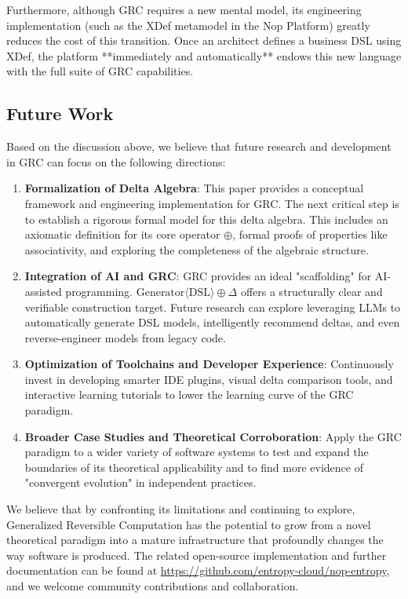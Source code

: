 \documentclass[11pt]{article}
\begin{document}
Furthermore, although GRC requires a new mental model, its engineering implementation (such as the XDef metamodel in the Nop Platform) greatly reduces the cost of this transition. Once an architect defines a business DSL using XDef, the platform **immediately and automatically** endows this new language with the full suite of GRC capabilities.

\subsection{Future Work}

Based on the discussion above, we believe that future research and development in GRC can focus on the following directions:

\begin{enumerate}
    \item \textbf{Formalization of Delta Algebra}: This paper provides a conceptual framework and engineering implementation for GRC. The next critical step is to establish a rigorous formal model for this delta algebra. This includes an axiomatic definition for its core operator $\oplus$, formal proofs of properties like associativity, and exploring the completeness of the algebraic structure.
    \item \textbf{Integration of AI and GRC}: GRC provides an ideal "scaffolding" for AI-assisted programming. $\text{Generator}\langle\text{DSL}\rangle \oplus \Delta$ offers a structurally clear and verifiable construction target. Future research can explore leveraging LLMs to automatically generate DSL models, intelligently recommend deltas, and even reverse-engineer models from legacy code.
    \item \textbf{Optimization of Toolchains and Developer Experience}: Continuously invest in developing smarter IDE plugins, visual delta comparison tools, and interactive learning tutorials to lower the learning curve of the GRC paradigm.
    \item \textbf{Broader Case Studies and Theoretical Corroboration}: Apply the GRC paradigm to a wider variety of software systems to test and expand the boundaries of its theoretical applicability and to find more evidence of "convergent evolution" in independent practices.
\end{enumerate}

We believe that by confronting its limitations and continuing to explore, Generalized Reversible Computation has the potential to grow from a novel theoretical paradigm into a mature infrastructure that profoundly changes the way software is produced. The related open-source implementation and further documentation can be found at \url{https://github.com/entropy-cloud/nop-entropy}, and we welcome community contributions and collaboration.
\end{document}
